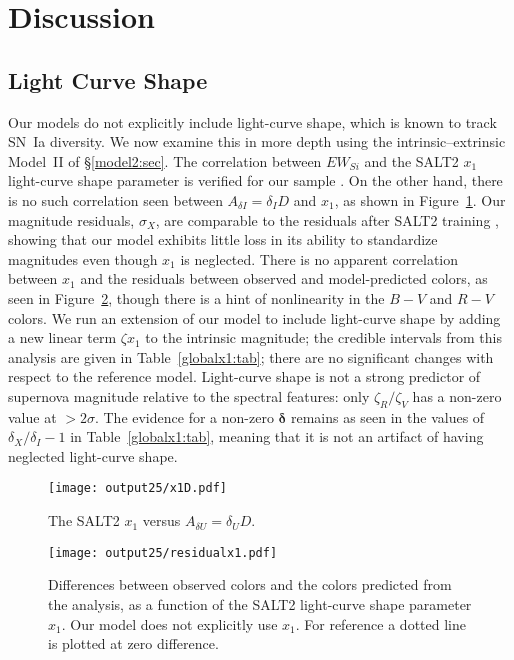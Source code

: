 \documentclass{aastex61}   	%
\begin{document}
\section{Discussion}
\label{discussion:sec}

\subsection{Light Curve Shape}
Our models do not explicitly include light-curve shape, which is known to track SN~Ia diversity.
We now examine this in more depth using the intrinsic--extrinsic Model~II of \S\ref{model2:sec}.
The correlation between $EW_{Si}$ and the SALT2 $x_1$ light-curve shape parameter is verified
for our sample \citep{2017Chotard}.
On the other hand, there is no such correlation seen between $A_{\delta I} = \delta_I D$ and $x_1$, as shown in Figure~\ref{x1:fig}. 
Our magnitude residuals, $\sigma_X$, are comparable to the residuals after SALT2 training
\citep{2010A&A...523A...7G}, showing that our model exhibits little loss in its ability to standardize
magnitudes even though $x_1$ is neglected.
There is no apparent correlation
between $x_1$ and the residuals between observed and model-predicted colors, as seen in
Figure~\ref{x1res:fig},
though there is a hint of nonlinearity in the $B-V$ and $R-V$ colors.
We  run an extension of our model to include light-curve shape by adding a new linear term $\zeta x_1$ to the 
intrinsic magnitude; the credible intervals
from this analysis are given in Table~\ref{globalx1:tab}; there are no significant changes with respect to the reference model. 
Light-curve shape is not a strong predictor of supernova magnitude relative to the spectral features: only $\zeta_R/\zeta_V$
has a non-zero value at $>2\sigma$.
The evidence for a non-zero $\pmb{\delta}$ remains as seen in the values of $\delta_X/\delta_I-1$ in Table~\ref{globalx1:tab}, meaning that it is not an artifact of
having neglected light-curve shape.

\begin{figure}[htbp] %
   \centering
   \texttt{[image: output25/x1D.pdf]}
    \caption{The SALT2 $x_1$ versus $A_{\delta U}  = \delta_U D$.
   \label{x1:fig}}
\end{figure}


\begin{figure}[htbp] %
   \centering
   \texttt{[image: output25/residualx1.pdf]}
    \caption{Differences between observed colors and the colors predicted from the analysis, as a function
            of the SALT2 light-curve shape parameter $x_1$.  Our model does not explicitly use $x_1$.  For reference a dotted line is plotted at zero difference.
   \label{x1res:fig}}
\end{figure}
\end{document}
